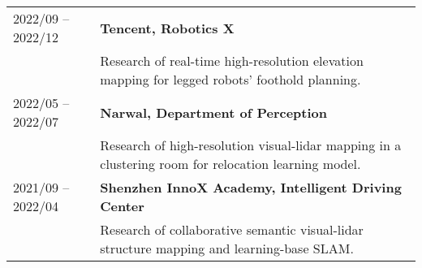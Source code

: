 %
%


 
			

\begin{tabular}{ll}	
	\textsc{2022/09 -- 2022/12}			  & \textbf{Tencent, Robotics X}\\
	& {Research of real-time high-resolution elevation mapping for legged robots' foothold planning.}\\
	\textsc{2022/05 -- 2022/07} 	&  \textbf{Narwal, Department of Perception}\\
	& {Research of high-resolution visual-lidar mapping in a clustering room for relocation learning model.}\\
	\textsc{2021/09 -- 2022/04} 	&  \textbf{Shenzhen InnoX Academy, Intelligent Driving Center} \\
	& {Research of collaborative semantic visual-lidar structure mapping and learning-base SLAM.}\\
									
\end{tabular}
